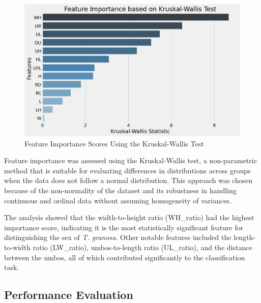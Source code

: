 \begin{figure}[!htbp]
	\centering
	\includegraphics[width=1.0\textwidth]{figures/kw.png}
	\caption{Feature Importance Scores Using the Kruskal-Wallis Test}
	\label{fig:kw}
\end{figure}

Feature importance was assessed using the Kruskal-Wallis test, a non-parametric method that is suitable for evaluating differences in distributions across groups when the data does not follow a normal distribution. This approach was chosen because of the non-normality of the dataset and its robustness in handling continuous and ordinal data without assuming homogeneity of variances. \cite{ribeiro2024}

The analysis showed that the width-to-height ratio (WH\_ratio) had the highest importance score, indicating it is the most statistically significant feature for distinguishing the sex of \textit{T. granosa}. Other notable features included the length-to-width ratio (LW\_ratio), umbos-to-length ratio (UL\_ratio), and the distance between the umbos, all of which contributed significantly to the classification task.

\subsection{Performance Evaluation}

